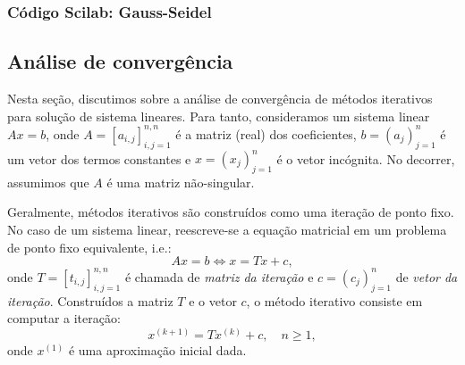 \ifisscilab
\subsubsection{Código Scilab: Gauss-Seidel}


\fi

\subsection{Análise de convergência}

Nesta seção, discutimos sobre a análise de convergência de métodos iterativos para solução de sistema lineares. Para tanto, consideramos um sistema linear $Ax = b$, onde $A = [a_{i,j}]_{i,j=1}^{n,n}$ é a matriz (real) dos coeficientes, $b = (a_j)_{j=1}^n$ é um vetor dos termos constantes e $x = (x_j)_{j=1}^n$ é o vetor incógnita. No decorrer, assumimos que $A$ é uma matriz não-singular.

Geralmente, métodos iterativos são construídos como uma iteração de ponto fixo. No caso de um sistema linear, reescreve-se a equação matricial em um problema de ponto fixo equivalente, i.e.:
\begin{equation*}
  Ax = b \Leftrightarrow x = Tx + c,
\end{equation*}
onde $T = [t_{i,j}]_{i,j=1}^{n,n}$ é chamada de \emph{matriz da iteração} e $c = (c_j)_{j=1}^n$ de \emph{vetor da iteração}. Construídos a matriz $T$ e o vetor $c$, o método iterativo consiste em computar a iteração:
\begin{equation*}
  x^{(k+1)} = Tx^{(k)} + c,\quad n\geq 1, 
\end{equation*}
onde $x^{(1)}$ é uma aproximação inicial dada.

